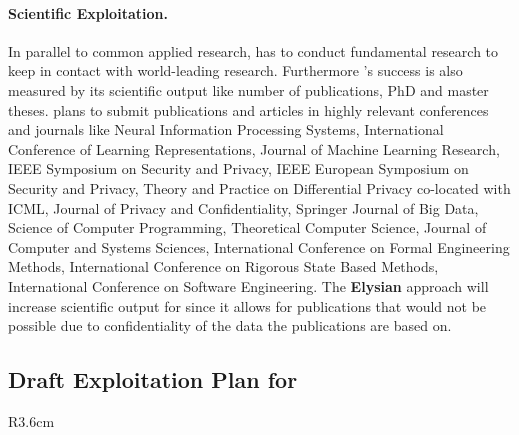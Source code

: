 \documentclass[a4paper,11pt]{article}
\newcommand{\project}[1]{\textbf{#1}\xspace}
\newcommand{\SECURITY}{\project{Elysian}}
\newcommand{\TheProject}{\SECURITY}
\begin{document}
 \paragraph{Scientific Exploitation.} In parallel to common applied research, \SCCHshort{} has to conduct fundamental research to keep in contact with world-leading research. Furthermore \SCCHshort{}'s success is also measured by its scientific output like number of publications, PhD and master theses. \SCCHshort{} plans to submit publications and articles in highly relevant conferences and journals like Neural Information Processing Systems, International Conference of Learning Representations, Journal of Machine Learning Research, IEEE Symposium on Security and Privacy, IEEE European Symposium on Security and Privacy, Theory and Practice on Differential Privacy co-located with ICML, Journal of Privacy and Confidentiality, Springer Journal of Big Data, Science of Computer Programming, Theoretical Computer Science, Journal of Computer and Systems Sciences,  International Conference on Formal Engineering Methods, International Conference on Rigorous State Based Methods, International Conference on Software Engineering. The \TheProject{} approach will increase scientific output for \SCCHshort{} since it allows for publications that would not be possible due to confidentiality of the data the publications are based on.


\horizontalline

\subsection*{Draft Exploitation Plan for \SOPRAshort{}}
\vspace{-6pt}

\begin{wrapfigure}{R}{3.6cm}
\vspace{-1.3cm}
\hfill {}
\vspace{-0.8cm}
\end{wrapfigure}
\end{document}
